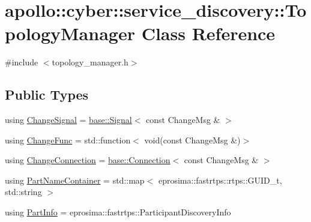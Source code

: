 \hypertarget{classapollo_1_1cyber_1_1service__discovery_1_1TopologyManager}{\section{apollo\-:\-:cyber\-:\-:service\-\_\-discovery\-:\-:Topology\-Manager Class Reference}
\label{classapollo_1_1cyber_1_1service__discovery_1_1TopologyManager}
}


{\ttfamily \#include $<$topology\-\_\-manager.\-h$>$}

\subsection*{Public Types}
\begin{DoxyCompactItemize}
\item 
using \hyperlink{classapollo_1_1cyber_1_1service__discovery_1_1TopologyManager_a7ba67fa3500a132796c24cd4aa7356f6}{Change\-Signal} = \hyperlink{classapollo_1_1cyber_1_1base_1_1Signal}{base\-::\-Signal}$<$ const Change\-Msg \& $>$
\item 
using \hyperlink{classapollo_1_1cyber_1_1service__discovery_1_1TopologyManager_a50328f9e6813bf53a9e974bb39f716f5}{Change\-Func} = std\-::function$<$ void(const Change\-Msg \&)$>$
\item 
using \hyperlink{classapollo_1_1cyber_1_1service__discovery_1_1TopologyManager_a9e207f3236b725d74eb37e5d27551ae6}{Change\-Connection} = \hyperlink{classapollo_1_1cyber_1_1base_1_1Connection}{base\-::\-Connection}$<$ const Change\-Msg \& $>$
\item 
using \hyperlink{classapollo_1_1cyber_1_1service__discovery_1_1TopologyManager_ab64bea3df8dfe44534854c87b84925a2}{Part\-Name\-Container} = std\-::map$<$ eprosima\-::fastrtps\-::rtps\-::\-G\-U\-I\-D\-\_\-t, std\-::string $>$
\item 
using \hyperlink{classapollo_1_1cyber_1_1service__discovery_1_1TopologyManager_aa25acdf39ae101851911d7562d332cdf}{Part\-Info} = eprosima\-::fastrtps\-::\-Participant\-Discovery\-Info
\end{DoxyCompactItemize}
